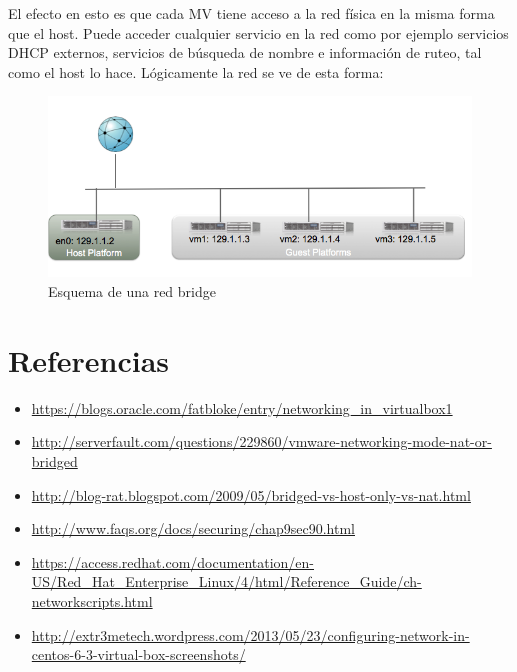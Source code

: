 \documentclass[11pt]{article}
\begin{document}
	El efecto en esto es que cada MV tiene acceso a la red física en la misma forma que el host. Puede acceder cualquier servicio en la red como por ejemplo servicios DHCP externos, servicios de búsqueda de nombre e información de ruteo, tal como el host lo hace. Lógicamente la red se ve de esta forma:

	\begin{figure}[ht]
	\center
	\includegraphics[width=0.75\linewidth]{ss/bridge-network.png} 
	\caption{Esquema de una red bridge} 
	\end{figure}


\section{Referencias}
	\begin{itemize}
		\item \url{https://blogs.oracle.com/fatbloke/entry/networking_in_virtualbox1}
		\item \url{http://serverfault.com/questions/229860/vmware-networking-mode-nat-or-bridged}
		\item \url{http://blog-rat.blogspot.com/2009/05/bridged-vs-host-only-vs-nat.html}
		\item \url{http://www.faqs.org/docs/securing/chap9sec90.html}
		\item \scriptsize \url{https://access.redhat.com/documentation/en-US/Red_Hat_Enterprise_Linux/4/html/Reference_Guide/ch-networkscripts.html}
		\item \scriptsize \url{http://extr3metech.wordpress.com/2013/05/23/configuring-network-in-centos-6-3-virtual-box-screenshots/}
	\end{itemize}
\end{document}
